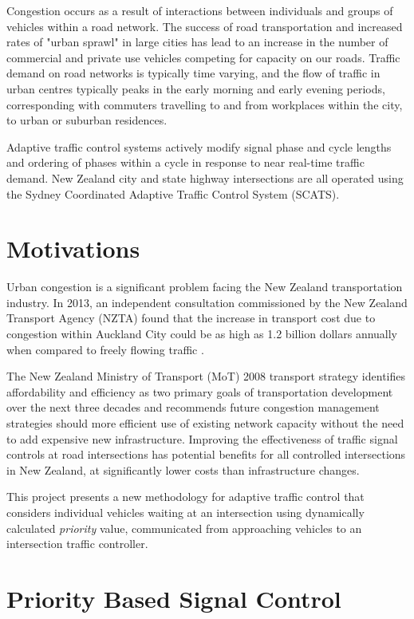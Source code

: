 Congestion occurs as a result of interactions between individuals and groups of vehicles within a road network. The success of road transportation and increased rates of "urban sprawl" in large cities has lead to an increase in the number of commercial and private use vehicles competing for capacity on our roads. Traffic demand on road networks is typically time varying, and the flow of traffic in urban centres typically peaks in the early morning and early evening periods, corresponding with commuters travelling to and from workplaces within the city, to urban or suburban residences.


Adaptive traffic control systems actively modify signal phase and cycle lengths and ordering of phases within a cycle in response to near real-time traffic demand. New Zealand city and state highway intersections are all operated using the Sydney Coordinated Adaptive Traffic Control System (SCATS). 
\section {Motivations}

Urban congestion is a significant problem facing the New Zealand transportation industry. In 2013, an independent consultation commissioned by the New Zealand Transport Agency (NZTA) found that the increase in transport cost due to congestion within Auckland City could be as high as 1.2 billion dollars annually when compared to freely flowing traffic \cite{wallis2013costs}. 

The New Zealand Ministry of Transport (MoT) 2008 transport strategy identifies affordability and efficiency as two primary goals of transportation development over the next three decades and recommends future congestion management strategies should more efficient use of existing network capacity without the need to add expensive new infrastructure. Improving the effectiveness of traffic signal controls at road intersections has potential benefits for all controlled intersections in New Zealand, at significantly lower costs than infrastructure changes.

This project presents a new methodology for adaptive traffic control that considers individual vehicles waiting at an intersection using dynamically calculated \emph{priority} value, communicated from approaching vehicles to an intersection traffic controller.

\section{Priority Based Signal Control}

